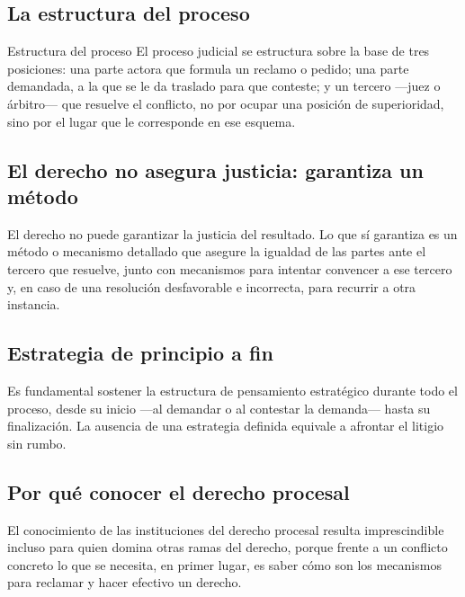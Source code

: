 \documentclass[12pt,oneside]{book}
\begin{document}
\subsection{La estructura del proceso}

\begin{definition}{Estructura del proceso}
El proceso judicial se estructura sobre la base de tres posiciones: una parte actora que formula un reclamo o pedido; una parte demandada, a la que se le da traslado para que conteste; y un tercero —juez o árbitro— que resuelve el conflicto, no por ocupar una posición de superioridad, sino por el lugar que le corresponde en ese esquema.
\end{definition}

\subsection{El derecho no asegura justicia: garantiza un método}

\begin{important}
El derecho no puede garantizar la justicia del resultado. Lo que sí garantiza es un método o mecanismo detallado que asegure la igualdad de las partes ante el tercero que resuelve, junto con mecanismos para intentar convencer a ese tercero y, en caso de una resolución desfavorable e incorrecta, para recurrir a otra instancia.
\end{important}

\subsection{Estrategia de principio a fin}

Es fundamental sostener la estructura de pensamiento estratégico durante todo el proceso, desde su inicio —al demandar o al contestar la demanda— hasta su finalización. La ausencia de una estrategia definida equivale a afrontar el litigio sin rumbo.

\subsection{Por qué conocer el derecho procesal}

El conocimiento de las instituciones del derecho procesal resulta imprescindible incluso para quien domina otras ramas del derecho, porque frente a un conflicto concreto lo que se necesita, en primer lugar, es saber cómo son los mecanismos para reclamar y hacer efectivo un derecho.
\end{document}
